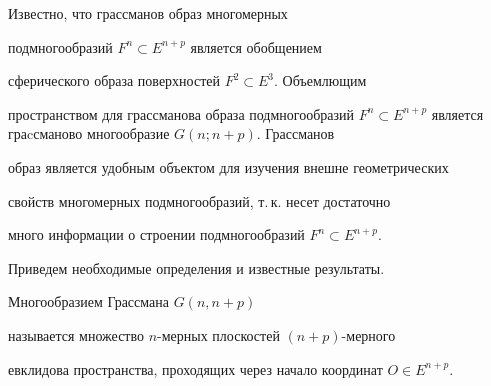 \pagestyle{plain} %







\maketitle


\label{begin}








Известно, что грассманов образ многомерных


подмногообразий $F^{n}\subset E^{n+p}$ является обобщением


сферического образа поверхностей $F^{2}\subset E^{3}$. Объемлющим


пространством для грассманова образа подмногообразий $F^{n}\subset


E^{n+p}$ является граcсманово многообразие $G(n;n+p)$. Грассманов


образ является удобным объектом для изучения внешне геометрических


свойств многомерных подмногообразий, т.\,к. несет достаточно


много информации о строении подмногообразий $F^{n}\subset


E^{n+p}$.





Приведем необходимые определения и известные результаты.





\begin{defn}


Многообразием Грассмана $G(n,n+p)$


называется множество $n$-мерных плоскостей $({n+p})$-мерного


евклидова пространства, проходящих через начало координат $O\in


E^{n+p}$.


\end{defn}





